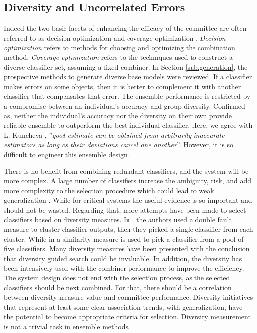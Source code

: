 \subsection{Diversity and Uncorrelated Errors}
Indeed the two basic facets of enhancing the efficacy of the committee are often referred to as decision optimization and coverage optimization \cite{ho2002}. \textit{Decision optimization} refers to methods for choosing and optimizing the combination method. \textit{Coverage optimization} refers to the techniques used to construct a diverse classifier set, assuming a fixed combiner. In Section \ref{sub.generation}, the prospective methods to generate diverse base models were reviewed. 
If a classifier makes errors on some objects, then it is better to complement it with another classifier that compensates that error. The ensemble performance is restricted by a compromise between an individual's accuracy and group diversity. Confirmed as, neither the individual's accuracy \cite{rogova1994} nor the diversity \cite{ruta2001a} on their own provide reliable ensemble to outperform the best individual classifier. Here, we agree with  L. Kuncheva \cite{kuncheva2014}, ''\textit{good estimate can be obtained from arbitrarily inaccurate estimators as long as their deviations cancel one another}''. However, it is so difficult to engineer this ensemble design.   


There is no benefit from combining redundant classifiers, and the system will be more complex. A large number of classifiers increase the ambiguity, risk, and add more complexity to the selection procedure which could lead to weak generalization \cite{ruta2005}. While for critical systems the useful evidence is so important and should not be wasted. Regarding that, more attempts have been made to select classifiers based on diversity measures. In \cite{giacinto2001}, the authors used a double fault measure to cluster classifier outputs, then they picked a single classifier from each cluster. While in \cite{kim1997} a similarity measure is used to pick a classifier from a pool of five classifiers. Many diversity measures have been presented \cite{kuncheva2003,ruta2001a} with the conclusion that diversity guided search could be invaluable. In addition, the diversity has been intensively used with the combiner performance \cite{ruta2005,li2012,brown2010} to improve the efficiency. The system design does not end with the selection process, as the selected classifiers should be next combined. For that, there should be a correlation between diversity measure value and committee performance. Diversity initiatives that represent at least some clear association trends, with generalization, have the potential to become appropriate criteria for selection. Diversity measurement is not a trivial task in ensemble methods. 


